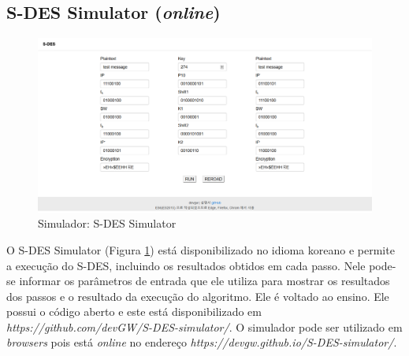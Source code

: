 
\subsection{S-DES Simulator (\textit{online})}

\begin{figure}[H]
    \centering
    \caption{Simulador: S-DES Simulator}
    \label{fig:sdessimulatorkr}
    \includegraphics[width=.75\linewidth]{Simuladores/SDESSimulatorKr.png}
\end{figure}

O S-DES Simulator (Figura \ref{fig:sdessimulatorkr}) está disponibilizado no idioma koreano e permite a execução do S-DES, incluindo os resultados obtidos em cada passo. Nele pode-se informar os parâmetros de entrada que ele utiliza para mostrar os resultados dos passos e o resultado da execução do algoritmo. Ele é voltado ao ensino. Ele possui o código aberto e este está disponibilizado em \textit{https://github.com/devGW/S-DES-simulator/}. O simulador pode ser utilizado em \textit{browsers} pois está \textit{online} no endereço \textit{https://devgw.github.io/S-DES-simulator/}. \cite{woo18}


